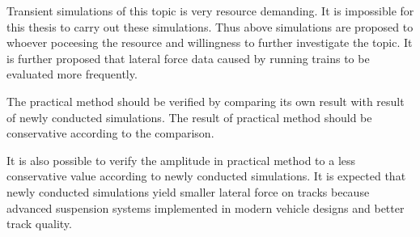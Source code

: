 Transient simulations of this topic is very resource demanding. It is impossible for this thesis to carry out these simulations. Thus above simulations are proposed to whoever poceesing the resource and willingness to further investigate the topic. It is further proposed that lateral force data caused by running trains to be evaluated more frequently.

The practical method should be verified by comparing its own result with result of newly conducted simulations. The result of practical method should be conservative according to the comparison. 

It is also possible to verify the amplitude in practical method to a less conservative value according to newly conducted simulations. It is expected that newly conducted simulations yield smaller lateral force on tracks because advanced suspension systems implemented in modern vehicle designs and better track quality.
